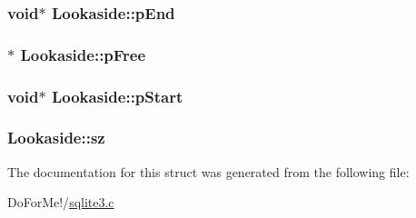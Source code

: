 \hypertarget{struct_lookaside_ad3555c5558e104f2b82f62bf642cf831}{
\subsubsection[{p\-End}]{\setlength{\rightskip}{0pt plus 5cm}void$\ast$ Lookaside\-::p\-End}}\label{struct_lookaside_ad3555c5558e104f2b82f62bf642cf831}
\hypertarget{struct_lookaside_a318d2faa7f976f9d1b3c6e08bdc1d992}{
\subsubsection[{p\-Free}]{$\ast$ Lookaside\-::p\-Free}}\label{struct_lookaside_a318d2faa7f976f9d1b3c6e08bdc1d992}
\hypertarget{struct_lookaside_a47073fcdffdc5a7a1464f0d09bfc17f9}{
\subsubsection[{p\-Start}]{\setlength{\rightskip}{0pt plus 5cm}void$\ast$ Lookaside\-::p\-Start}}\label{struct_lookaside_a47073fcdffdc5a7a1464f0d09bfc17f9}
\hypertarget{struct_lookaside_a2e8346b6cebbb64d9a6886a19ef843a1}{
\subsubsection[{sz}]{ Lookaside\-::sz}}\label{struct_lookaside_a2e8346b6cebbb64d9a6886a19ef843a1}


The documentation for this struct was generated from the following file\-:\begin{DoxyCompactItemize}
\item 
Do\-For\-Me!/\hyperlink{sqlite3_8c}{sqlite3.\-c}\end{DoxyCompactItemize}
